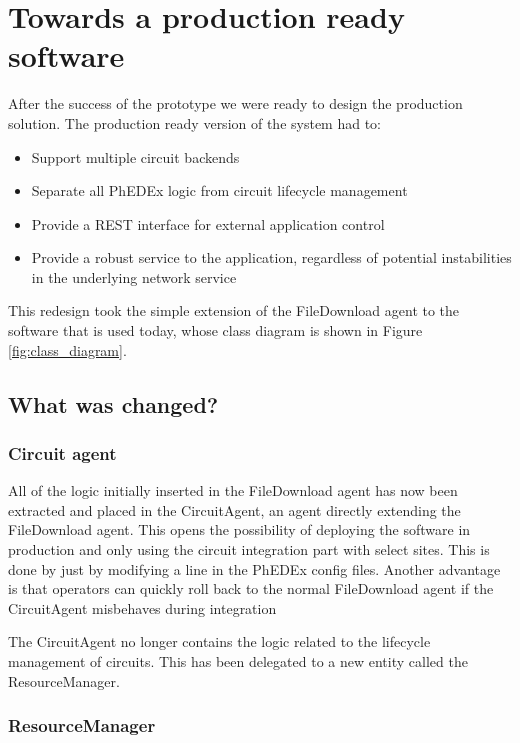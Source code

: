 \section{Towards a production ready software}

After the success of the prototype we were ready to design the production solution.
The production ready version of the system had to:
\begin{itemize}
  \item Support multiple circuit backends
  \item Separate all PhEDEx logic from circuit lifecycle management
  \item Provide a REST interface for external application control
  \item Provide a robust service to the application, regardless of 
  potential instabilities in the underlying network service
\end{itemize}

This redesign took the simple extension of the FileDownload agent to the 
software that is used today, whose class diagram is shown in Figure \ref{fig:class_diagram}.

\subsection{What was changed?}

\subsubsection{Circuit agent}

All of the logic initially inserted in the FileDownload agent has now been extracted and 
placed in the CircuitAgent, an agent directly extending the FileDownload agent. This opens 
the possibility of deploying the software in production and only using the circuit integration 
part with select sites. This is done by just by modifying a line in the PhEDEx config files.
Another advantage is that operators can quickly roll back to the normal FileDownload agent 
if the CircuitAgent misbehaves during integration

The CircuitAgent no longer contains the logic related to the lifecycle management of circuits.
This has been delegated to a new entity called the ResourceManager.

\subsubsection{ResourceManager}

